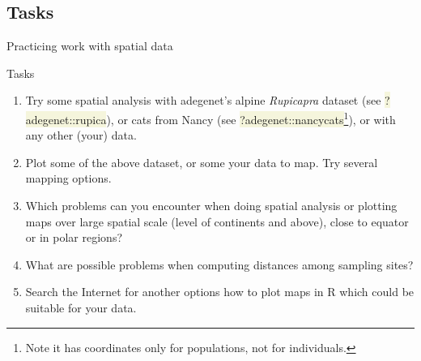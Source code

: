 \documentclass[compress, xelatex, 11pt, xcolor=svgnames, aspectratio=169, url={hyphens, lowtilde}]{beamer}
\renewcommand{\texttt}[1]{\colorbox{Beige}{{\ttfamily #1}}}
\begin{document}
% 

\subsection{Tasks}

\begin{frame}{Practicing work with spatial data}
	\begin{exampleblock}{Tasks}
		\begin{enumerate}
			\item Try some spatial analysis with adegenet's alpine \textit{Rupicapra} dataset (see \texttt{?adegenet::rupica}), or cats from Nancy (see \texttt{?adegenet::nancycats}\footnote{Note it has coordinates only for populations, not for individuals.}), or with any other (your) data.
			\item Plot some of the above dataset, or some your data to map. Try several mapping options.
			\item Which problems can you encounter when doing spatial analysis or plotting maps over large spatial scale (level of continents and above), close to equator or in polar regions?
			\item What are possible problems when computing distances among sampling sites?
			\item Search the Internet for another options how to plot maps in R which could be suitable for your data.
		\end{enumerate}
	\end{exampleblock}
\end{frame}
\end{document}
